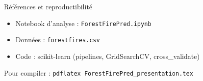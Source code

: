 \documentclass[aspectratio=169,11pt]{beamer}
\begin{document}
\begin{frame}{R\'ef\'erences et reproductibilit\'e}
  \begin{itemize}
    \item Notebook d'analyse : \texttt{ForestFirePred.ipynb}
    \item Donn\'ees : \texttt{forestfires.csv}
    \item Code : scikit-learn (pipelines, GridSearchCV, cross\_validate)
  \end{itemize}

  \vspace{0.6em}
  Pour compiler : \texttt{pdflatex ForestFirePred\_presentation.tex}
\end{frame}
\end{document}
